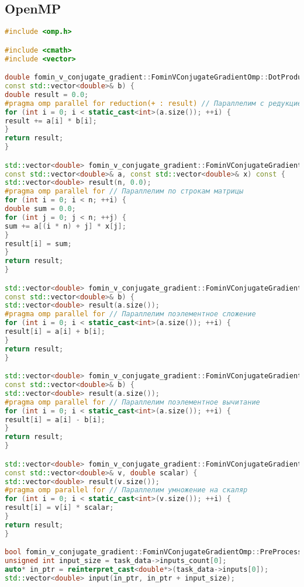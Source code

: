\documentclass[12pt]{article}
\begin{document}
\subsection*{OpenMP}
\begin{lstlisting}[language=C++]
#include <omp.h>

#include <cmath>
#include <vector>

double fomin_v_conjugate_gradient::FominVConjugateGradientOmp::DotProduct(const std::vector<double>& a,
const std::vector<double>& b) {
double result = 0.0;
#pragma omp parallel for reduction(+ : result) // Параллелим с редукцией
for (int i = 0; i < static_cast<int>(a.size()); ++i) {
result += a[i] * b[i];
}
return result;
}

std::vector<double> fomin_v_conjugate_gradient::FominVConjugateGradientOmp::MatrixVectorMultiply(
const std::vector<double>& a, const std::vector<double>& x) const {
std::vector<double> result(n, 0.0);
#pragma omp parallel for // Параллелим по строкам матрицы
for (int i = 0; i < n; ++i) {
double sum = 0.0;
for (int j = 0; j < n; ++j) {
sum += a[(i * n) + j] * x[j];
}
result[i] = sum;
}
return result;
}

std::vector<double> fomin_v_conjugate_gradient::FominVConjugateGradientOmp::VectorAdd(const std::vector<double>& a,
const std::vector<double>& b) {
std::vector<double> result(a.size());
#pragma omp parallel for // Параллелим поэлементное сложение
for (int i = 0; i < static_cast<int>(a.size()); ++i) {
result[i] = a[i] + b[i];
}
return result;
}

std::vector<double> fomin_v_conjugate_gradient::FominVConjugateGradientOmp::VectorSub(const std::vector<double>& a,
const std::vector<double>& b) {
std::vector<double> result(a.size());
#pragma omp parallel for // Параллелим поэлементное вычитание
for (int i = 0; i < static_cast<int>(a.size()); ++i) {
result[i] = a[i] - b[i];
}
return result;
}

std::vector<double> fomin_v_conjugate_gradient::FominVConjugateGradientOmp::VectorScalarMultiply(
const std::vector<double>& v, double scalar) {
std::vector<double> result(v.size());
#pragma omp parallel for // Параллелим умножение на скаляр
for (int i = 0; i < static_cast<int>(v.size()); ++i) {
result[i] = v[i] * scalar;
}
return result;
}

bool fomin_v_conjugate_gradient::FominVConjugateGradientOmp::PreProcessingImpl() {
unsigned int input_size = task_data->inputs_count[0];
auto* in_ptr = reinterpret_cast<double*>(task_data->inputs[0]);
std::vector<double> input(in_ptr, in_ptr + input_size);


\end{lstlisting}
\end{document}
